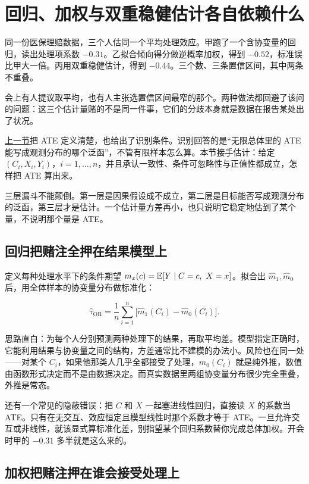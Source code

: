 \section{回归、加权与双重稳健估计各自依赖什么}
\label{sec:13-Machine-Learning/12-Causal-Inference/05}

同一份医保理赔数据，三个人估同一个平均处理效应。甲跑了一个含协变量的回归，读出处理项系数 \(-0.31\)。乙拟合倾向得分做逆概率加权，得到 \(-0.52\)，标准误比甲大一倍。丙用双重稳健估计，得到 \(-0.44\)。三个数、三条置信区间，其中两条不重叠。

会上有人提议取平均，也有人主张选置信区间最窄的那个。两种做法都回避了该问的问题：这三个估计量赌的不是同一件事，它们的分歧本身就是数据在报告某处出了状况。

\hyperref[sec:13-Machine-Learning/12-Causal-Inference/04]{上一节}把 ATE 定义清楚，也给出了识别条件。识别回答的是``无限总体里的 ATE 能写成观测分布的哪个泛函''，不管有限样本怎么算。本节接手估计：给定 \((C_i,X_i,Y_i)\)，\(i=1,\ldots,n\)，并且承认一致性、条件可忽略性与正值性都成立，怎样把 ATE 算出来。

三层漏斗不能颠倒。第一层是因果假设成不成立，第二层是目标能否写成观测分布的泛函，第三层才是估计。一个估计量方差再小，也只说明它稳定地估到了某个量，不说明那个量是 ATE。

\subsection{回归把赌注全押在结果模型上}

定义每种处理水平下的条件期望 \(m_x(c)=\mathbb{E}[Y\mid C=c,\ X=x]\)。拟合出 \(\widehat m_1,\widehat m_0\) 后，用全体样本的协变量分布做标准化：

\[
\widehat\tau_{\mathrm{OR}}=\frac1n\sum_{i=1}^{n}\bigl[\widehat m_1(C_i)-\widehat m_0(C_i)\bigr].
\]

思路直白：为每个人分别预测两种处理下的结果，再取平均差。模型指定正确时，它能利用结果与协变量之间的结构，方差通常比不建模的办法小。风险也在同一处——对某个 \(C_i\)，如果他那类人几乎全都接受了处理，\(\widehat m_0(C_i)\) 就是纯外推，数值由函数形式决定而不是由数据决定。而真实数据里两组协变量分布很少完全重叠，外推是常态。

还有一个常见的隐蔽错误：把 \(C\) 和 \(X\) 一起塞进线性回归，直接读 \(X\) 的系数当 ATE。只有在无交互、效应恒定且模型线性时那个系数才等于 ATE。一旦允许交互或非线性，就该显式算标准化差，别指望某个回归系数替你完成总体加权。开会时甲的 \(-0.31\) 多半就是这么来的。

\subsection{加权把赌注押在谁会接受处理上}

